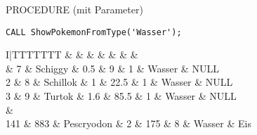 \begin{sql}{PROCEDURE (mit Parameter)}
    \begin{lstlisting}[language=mysql]
        CALL ShowPokemonFromType('Wasser');
    \end{lstlisting}

    \setcounter{rownum}{0}
    \begin{tabular}{I|TTTTTTT}
                                   &     &  &  &  &  &  &  \\                          & 7                         & Schiggy                  & 0.5                         & 9                           & 1                              & Wasser                         & NULL                             \\
        2                          & 8                         & Schillok                 & 1                           & 22.5                        & 1                              & Wasser                         & NULL                             \\
        3                          & 9                         & Turtok                   & 1.6                         & 85.5                        & 1                              & Wasser                         & NULL                             \\
         &                                                                                                                                                                                              \\
        141                        & 883                       & Pescryodon               & 2                           & 175                         & 8                              & Wasser                         & Eis                              \\
    \end{tabular}
\end{sql}

